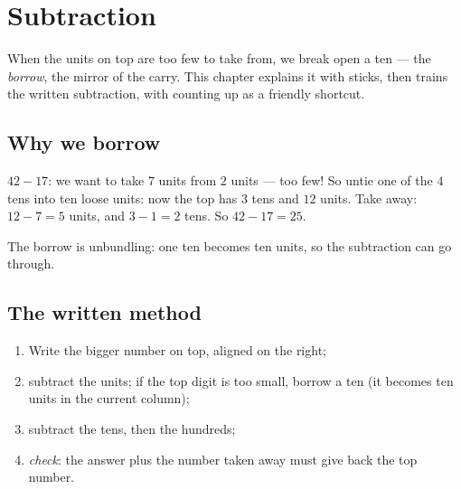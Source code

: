 \chapter{Subtraction}\label{ch:g2:subtraction}

When the units on top are too few to take from, we break open a
ten --- the \emph{borrow}, the mirror of the carry. This chapter
explains it with sticks, then trains the written subtraction, with
counting up as a friendly shortcut.

\section{Why we borrow}

\begin{example}\label{ex:g2:subtraction:unbundle}
$42 - 17$: we want to take $7$ units from $2$ units --- too few!
So untie one of the $4$ tens into ten loose units: now the top has
$3$ tens and $12$ units. Take away: $12 - 7 = 5$ units, and
$3 - 1 = 2$ tens. So $42 - 17 = 25$.
\end{example}

\begin{omfigure}

{\small The borrow is unbundling: one ten becomes ten units, so the
subtraction can go through.}
\end{omfigure}

\section{The written method}

\begin{method}\label{met:g2:subtraction:column}
\begin{enumerate}
  \item Write the bigger number on top, aligned on the right;
  \item subtract the units; if the top digit is too small, borrow
        a ten (it becomes ten units in the current column);
  \item subtract the tens, then the hundreds;
  \item \emph{check}: the answer plus the number taken away must
        give back the top number.
\end{enumerate}
\end{method}

